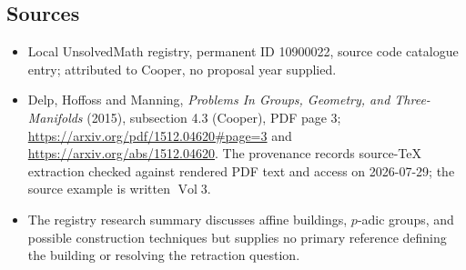 \documentclass[11pt]{article}
\begin{document}
\subsection{Sources}
\begin{itemize}
\item Local UnsolvedMath registry, permanent ID 10900022, source code catalogue entry; attributed to Cooper, no proposal year supplied.
\item Delp, Hoffoss and Manning, \emph{Problems In Groups, Geometry, and Three-Manifolds} (2015), subsection 4.3 (Cooper), PDF page 3; \url{https://arxiv.org/pdf/1512.04620#page=3} and \url{https://arxiv.org/abs/1512.04620}. The provenance records source-TeX extraction checked against rendered PDF text and access on 2026-07-29; the source example is written $\operatorname{Vol}3$.
\item The registry research summary discusses affine buildings, $p$-adic groups, and possible construction techniques but supplies no primary reference defining the building or resolving the retraction question.
\end{itemize}
\end{document}
